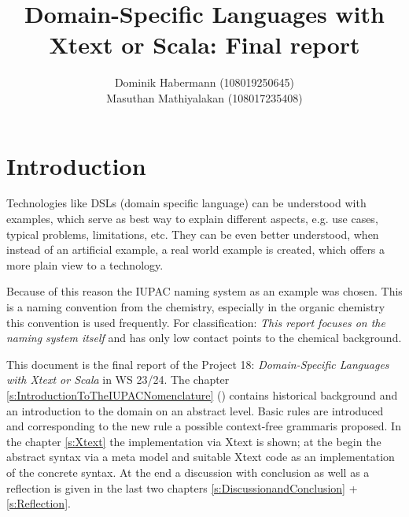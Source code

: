 \documentclass[
fontsize=11pt,
paper=a4,
abstract=true,
numbers=noenddot,
listof=totoc,
bibliography=totoc,
twoside,
open=right,
cleardoublepage=plain,
parskip=half+, %
BCOR=1cm, %
]{scrreprt}
\title{Domain-Specific Languages with Xtext or Scala: Final report}
\author{Dominik Habermann (108019250645)\\Masuthan Mathiyalakan (108017235408)}
\newcommand{\gerquot}[1]{\glqq#1\grqq}
\newcommand{\DSL}{domain specific language}
\newcommand{\CFG}{context-free grammar}
\begin{document}
% 

\setcounter{page}{1}

\maketitle
\tableofcontents

\chapter{Introduction}\label{s:Introduction}
Technologies like DSLs (\DSL) can be understood with examples, which serve as best way to explain different aspects, e.g. use cases, typical problems, limitations, etc. They can be even better understood, when instead of an artificial example, a real world example is created, which offers a more plain view to a technology.

Because of this reason the IUPAC naming system as an example was chosen. This is a naming convention from the chemistry, especially in the organic chemistry this convention is used frequently. For classification: \emph{This report focuses on the naming system itself} and has only low contact points to the chemical background.

This document is the final report of the Project 18: \emph{Domain-Specific Languages with Xtext or Scala} in WS 23/24. The chapter \ref{s:IntroductionToTheIUPACNomenclature} () contains historical background and an introduction to the domain on an abstract level. Basic rules are introduced and corresponding to the new rule a possible \CFG \space is proposed. In the chapter \ref{s:Xtext} the implementation via Xtext is shown; at the begin the abstract syntax via a meta model and suitable Xtext code as an implementation of the concrete syntax. At the end a discussion with conclusion as well as a reflection is given in the last two chapters \ref{s:DiscussionandConclusion} + \ref{s:Reflection}.

\end{document}

